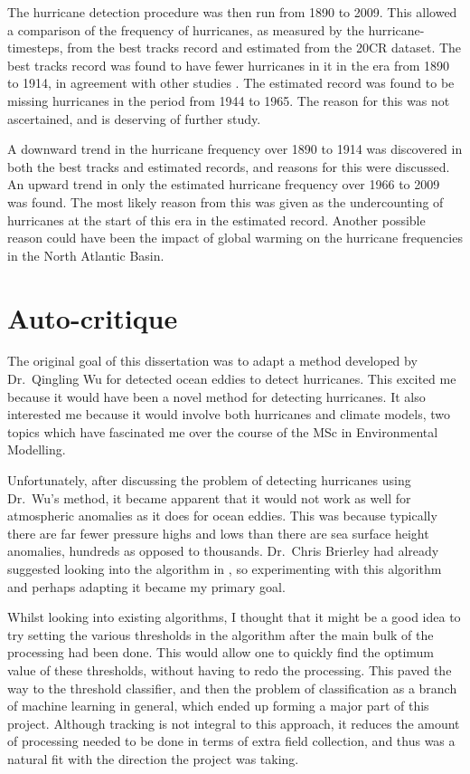 \documentclass[pdftex,12pt,a4paper]{report}
\begin{document}
The hurricane detection procedure was then run from 1890 to 2009. This allowed a comparison of the
frequency of hurricanes, as measured by the hurricane-timesteps, from the best tracks record and
estimated from the 20CR dataset. The best tracks record was found to have fewer hurricanes in it in
the era from 1890 to 1914, in agreement with other studies \parencite{vecchi2008estimates,
landsea2007counting}. The estimated record was found to be missing hurricanes in the period from
1944 to 1965. The reason for this was not ascertained, and is deserving of further study.

A downward trend in the hurricane frequency over 1890 to 1914 was discovered in both the best
tracks and estimated records, and reasons for this were discussed. An upward trend in only the
estimated hurricane frequency over 1966 to 2009 was found. The most likely reason from this was
given as the undercounting of hurricanes at the start of this era in the estimated record. Another
possible reason could have been the impact of global warming on the hurricane frequencies in the
North Atlantic Basin.

\chapter*{Auto-critique}

The original goal of this dissertation was to adapt a method developed by Dr.~Qingling Wu for
detected ocean eddies to detect hurricanes. This excited me because it would have been a novel
method for detecting hurricanes. It also interested me because it would involve both hurricanes and
climate models, two topics which have fascinated me over the course of the MSc in Environmental
Modelling.

Unfortunately, after discussing the problem of detecting hurricanes using Dr.~Wu's method, it became
apparent that it would not work as well for atmospheric anomalies as it does for ocean eddies. This
was because typically there are far fewer pressure highs and lows than there are sea surface height
anomalies, hundreds as opposed to thousands. Dr.~Chris Brierley had already suggested looking into
the algorithm in \textcite{walsh1997objective}, so experimenting with this algorithm and perhaps
adapting it became my primary goal.

Whilst looking into existing algorithms, I thought that it might be a good idea to try setting the
various thresholds in the algorithm after the main bulk of the processing had been done. This would
allow one to quickly find the optimum value of these thresholds, without having to redo the
processing. This paved the way to the threshold classifier, and then the problem of classification
as a branch of machine learning in general, which ended up forming a major part of this project.
Although tracking is not integral to this approach, it reduces the amount of processing needed to be
done in terms of extra field collection, and thus was a natural fit with the direction the project
was taking.
\end{document}
